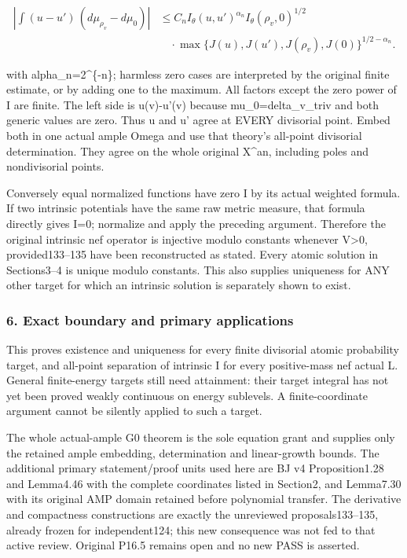 \documentclass[
]{article}
\begin{document}
\[\begin{aligned}
\left|\int(u-u')\,(d\mu_{\rho_v}-d\mu_0)\right|
&\leq C_n I_\theta(u,u')^{\alpha_n} I_\theta(\rho_v,0)^{1/2}\\
&\quad\cdot\max\{J(u),J(u'),J(\rho_v),J(0)\}^{1/2-\alpha_n}.
\end{aligned}\]

with alpha\_n=2\^{}\{-n\}; harmless zero cases are interpreted by the
original finite estimate, or by adding one to the maximum. All factors
except the zero power of I are finite. The left side is
\textbar u(v)-u'(v)\textbar{} because mu\_0=delta\_v\_triv and both
generic values are zero. Thus u and u' agree at EVERY divisorial point.
Embed both in one actual ample Omega and use that theory's all-point
divisorial determination. They agree on the whole original X\^{}an,
including poles and nondivisorial points.

Conversely equal normalized functions have zero I by its actual weighted
formula. If two intrinsic potentials have the same raw metric measure,
that formula directly gives I=0; normalize and apply the preceding
argument. Therefore the original intrinsic nef operator is injective
modulo constants whenever V\textgreater0, provided133--135 have been
reconstructed as stated. Every atomic solution in Sections3--4 is unique
modulo constants. This also supplies uniqueness for ANY other target for
which an intrinsic solution is separately shown to exist.

\subsubsection{6. Exact boundary and primary
applications}\label{exact-boundary-and-primary-applications}

This proves existence and uniqueness for every finite divisorial atomic
probability target, and all-point separation of intrinsic I for every
positive-mass nef actual L. General finite-energy targets still need
attainment: their target integral has not yet been proved weakly
continuous on energy sublevels. A finite-coordinate argument cannot be
silently applied to such a target.

The whole actual-ample G0 theorem is the sole equation grant and
supplies only the retained ample embedding, determination and
linear-growth bounds. The additional primary statement/proof units used
here are BJ v4 Proposition1.28 and Lemma4.46 with the complete
coordinates listed in Section2, and Lemma7.30 with its original AMP
domain retained before polynomial transfer. The derivative and
compactness constructions are exactly the unreviewed proposals133--135,
already frozen for independent124; this new consequence was not fed to
that active review. Original P16.5 remains open and no new PASS is
asserted.
\end{document}
